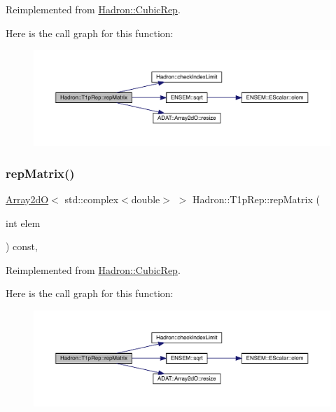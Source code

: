 Reimplemented from \mbox{\hyperlink{structHadron_1_1CubicRep_ac5d7e9e6f4ab1158b5fce3e4ad9e8005}{Hadron\+::\+Cubic\+Rep}}.

Here is the call graph for this function\+:
\nopagebreak
\begin{figure}[H]
\begin{center}
\leavevmode
\includegraphics[width=350pt]{df/dba/structHadron_1_1T1pRep_ad013f454206c3e9f9b7c78db7812df97_cgraph}
\end{center}
\end{figure}
\mbox{\label{structHadron_1_1T1pRep_ad013f454206c3e9f9b7c78db7812df97}} 
\subsubsection{\texorpdfstring{repMatrix()}{repMatrix()}\hspace{0.1cm}{\footnotesize\ttfamily [3/3]}}
{\footnotesize\ttfamily \mbox{\hyperlink{classADAT_1_1Array2dO}{Array2dO}}$<$ std\+::complex$<$double$>$ $>$ Hadron\+::\+T1p\+Rep\+::rep\+Matrix (\begin{DoxyParamCaption}\item[{int}]{elem }\end{DoxyParamCaption}) const\hspace{0.3cm}{\ttfamily [inline]}, {\ttfamily [virtual]}}



Reimplemented from \mbox{\hyperlink{structHadron_1_1CubicRep_ac5d7e9e6f4ab1158b5fce3e4ad9e8005}{Hadron\+::\+Cubic\+Rep}}.

Here is the call graph for this function\+:
\nopagebreak
\begin{figure}[H]
\begin{center}
\leavevmode
\includegraphics[width=350pt]{df/dba/structHadron_1_1T1pRep_ad013f454206c3e9f9b7c78db7812df97_cgraph}
\end{center}
\end{figure}



